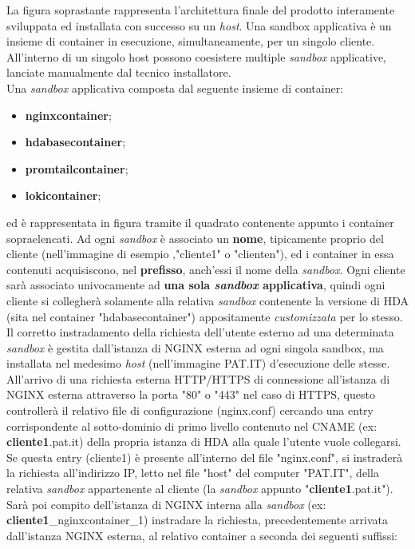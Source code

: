 La figura soprastante rappresenta l'architettura finale del prodotto interamente sviluppata ed installata con successo su un \textit{host}. 
Una sandbox applicativa è un insieme di container in esecuzione, simultaneamente, per un singolo cliente. All'interno di un singolo host possono coesistere multiple \textit{sandbox} applicative, lanciate manualmente dal tecnico installatore.\\
Una \textit{sandbox} applicativa composta dal seguente insieme di container:
\begin{itemize}
	\item \textbf{nginxcontainer};
	\item \textbf{hdabasecontainer};
	\item \textbf{promtailcontainer};
	\item \textbf{lokicontainer};
\end{itemize}
ed è rappresentata in figura tramite il quadrato contenente appunto i container sopraelencati. Ad ogni \textit{sandbox} è associato un \textbf{nome}, tipicamente proprio del cliente (nell'immagine di esempio ,"cliente1" o "clienten"), ed i container in essa contenuti acquisiscono, nel \textbf{prefisso}, anch'essi il nome della \textit{sandbox}. Ogni cliente sarà associato univocamente ad \textbf{una sola \textit{sandbox} applicativa}, quindi ogni cliente si collegherà solamente alla relativa \textit{sandbox} contenente la versione di HDA (sita nel container "hdabasecontainer") appositamente \textit{customizzata} per lo stesso.
Il corretto instradamento della richiesta dell'utente esterno ad una determinata \textit{sandbox} è gestita dall'istanza di NGINX esterna ad ogni singola sandbox, ma installata nel medesimo \textit{host} (nell'immagine PAT.IT) d'esecuzione delle stesse. All'arrivo di una richiesta esterna HTTP/HTTPS di connessione all'istanza di NGINX esterna attraverso la porta "80" o "443" nel caso di HTTPS, questo controllerà il relativo file di configurazione (nginx.conf) cercando una entry corrispondente al sotto-dominio di primo livello contenuto nel \gls{CNAME} (ex: \textbf{cliente1}.pat.it) della propria istanza di HDA alla quale l'utente vuole collegarsi. Se questa entry (cliente1) è presente all'interno del file "nginx.conf", si instraderà la richiesta all'indirizzo IP, letto nel file "host" del computer "PAT.IT", della relativa \textit{sandbox} appartenente al cliente (la \textit{sandbox} appunto "\textbf{cliente1}.pat.it"). Sarà poi compito dell'istanza di NGINX interna alla \textit{sandbox} (ex: \textbf{cliente1}\_nginxcontainer\_1) instradare la richiesta, precedentemente arrivata dall'istanza NGINX esterna, al relativo container a seconda dei seguenti suffissi:
